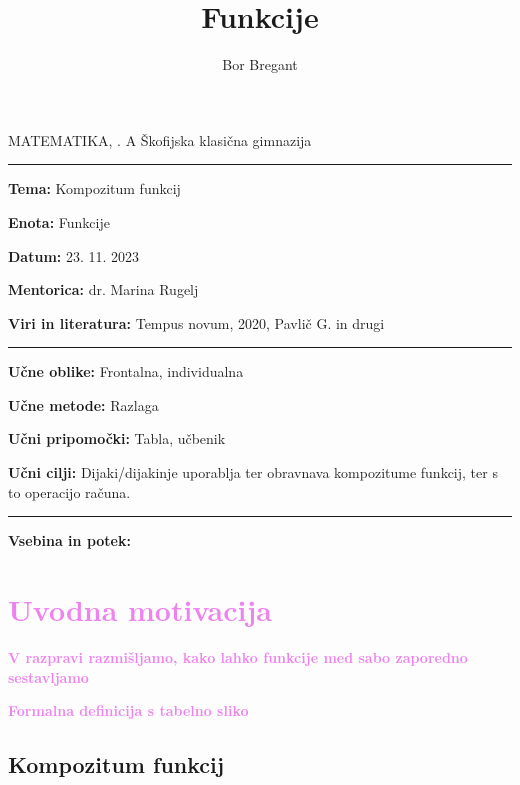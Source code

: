 \documentclass{article}
\title{Funkcije}
\author{Bor Bregant}
\date{\vspace{-5ex}}
\begin{document}
\thispagestyle{empty}	%

\noindent MATEMATIKA, . A \hfill Škofijska klasična gimnazija
\hrule
\vspace{1ex}
\noindent \textbf{Tema:} Kompozitum funkcij
\vspace{1ex}

\noindent \textbf{Enota:} Funkcije
\vspace{1ex}

\noindent \textbf{Datum:} 23. 11. 2023
\vspace{1ex}

\noindent \textbf{Mentorica:} dr. Marina Rugelj
\vspace{1ex}

\noindent \textbf{Viri in literatura:} Tempus novum, 2020, Pavlič G. in drugi
\vspace{1ex}
\hrule
\vspace{2ex}
\noindent \textbf{Učne oblike:} Frontalna, individualna
\vspace{1ex}

\noindent \textbf{Učne metode:} Razlaga
\vspace{1ex}

\noindent \textbf{Učni pripomočki:} Tabla, učbenik
\vspace{1ex}

\noindent \textbf{Učni cilji:} Dijaki/dijakinje uporablja ter obravnava kompozitume funkcij, ter s to operacijo računa.
\vspace{4ex}
\hrule
\vspace{5ex}
\noindent \textbf{Vsebina in potek:} 

\vspace{5ex}

\section*{\textcolor{violet}{Uvodna motivacija}}

\textbf{\textcolor{violet}{V razpravi razmišljamo, kako lahko funkcije med sabo zaporedno sestavljamo}}

\textbf{\textcolor{violet}{Formalna definicija s tabelno sliko}}

\subsection*{Kompozitum funkcij}
\end{document}
